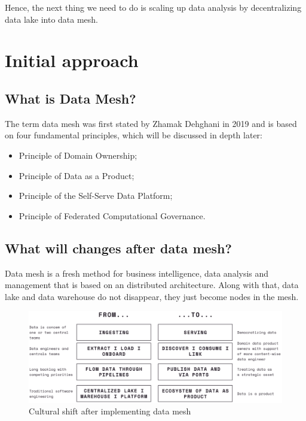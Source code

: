\documentclass[12pt, a4paper]{book}
\begin{document}
Hence, the next thing we need to do is scaling up data analysis by decentralizing data lake into data mesh.\cite{datameshweb}

\section{Initial approach}
\subsection{What is Data Mesh?}
The term data mesh was first stated by Zhamak Dehghani in 2019 and is based on four fundamental principles, which will be discussed in depth later:
	\begin{itemize}[nosep]
		\item Principle of Domain Ownership;
		\item Principle of Data as a Product;
		\item Principle of the Self-Serve Data Platform;
		\item Principle of Federated Computational Governance.
	\end{itemize}


\subsection{What will changes after data mesh?}
Data mesh is a fresh method for business intelligence, data analysis and management that is based on an distributed architecture. Along with that, data lake and data warehouse do not disappear, they just become nodes in the mesh. \cite{machado2022data,shiftkpmg}

\begin{figure}[ht]
	\begin{framed}
		\centering
		\includegraphics[width=16.5cm]{CulturalShift.png}
		\caption{Cultural shift after implementing data mesh}
		\label{culturalshift}
	\end{framed}
\end{figure}
\end{document}
